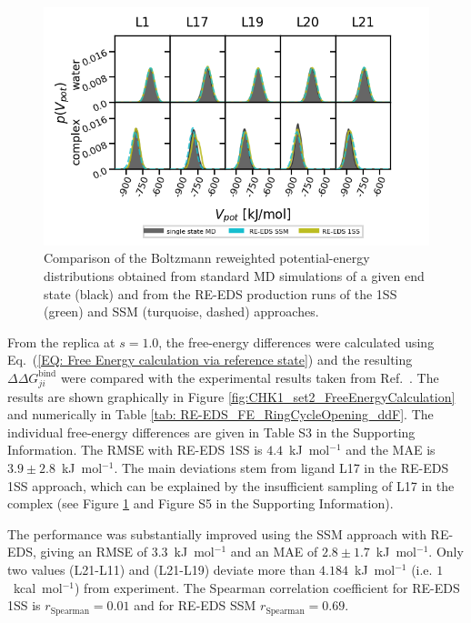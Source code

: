 \begin{figure}[h]
    \centering
    \includegraphics[width=\columnwidth]{fig/results/ringOpening/FE/RingClosure_system_final_sampling.png}
    \caption{Comparison of the Boltzmann reweighted potential-energy distributions obtained from standard MD simulations of a given end state (black) and from the RE-EDS production runs of the 1SS (green) and SSM (turquoise, dashed) approaches.}
    \label{fig:RingOpening_sampling_comparison}
\end{figure}

From the replica at $s=1.0$, the free-energy differences were calculated using Eq.~(\ref{EQ: Free Energy calculation via reference state}) and the resulting $\Delta \Delta G^\text{bind}_{ji}$ were compared with the experimental results taken from Ref.~\cite{Huang2012}. The results are shown graphically in Figure \ref{fig:CHK1_set2_FreeEnergyCalculation} and numerically in Table \ref{tab: RE-EDS_FE_RingCycleOpening_ddF}. The individual free-energy differences are given in Table S3 in the Supporting Information. %
The RMSE with RE-EDS 1SS is $4.4$~kJ~mol$^{-1}$ and the MAE is $3.9\pm2.8$~kJ~mol$^{-1}$. 
%
%
The main deviations stem from ligand L17 in the RE-EDS 1SS approach, which can be explained by the insufficient sampling of L17 in the complex (see Figure \ref{fig:RingOpening_sampling_comparison} and Figure S5 in the Supporting Information). %

The performance was substantially improved using the SSM approach with RE-EDS, giving an RMSE of $3.3$~kJ~mol$^{-1}$ and an MAE of $2.8 \pm 1.7$~kJ~mol$^{-1}$. 
Only two values (L21-L11) and (L21-L19) deviate more than $4.184$~kJ~mol$^{-1}$ (i.e. $1$~kcal~mol$^{-1}$) from experiment.
The Spearman correlation coefficient for RE-EDS 1SS is $r_{\text{Spearman}}=0.01$ and for RE-EDS SSM $r_{\text{Spearman}}=0.69$.

